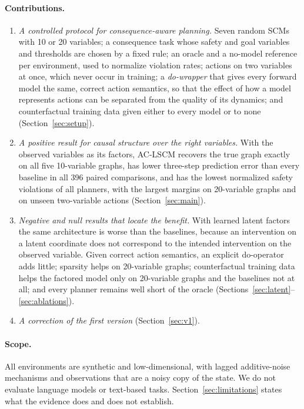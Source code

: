 \documentclass[11pt]{article}
\begin{document}
\paragraph{Contributions.}
\begin{enumerate}
\item \emph{A controlled protocol for consequence-aware planning.} Seven
random SCMs with 10 or 20 variables; a consequence task whose safety and goal
variables and thresholds are chosen by a fixed rule; an oracle and a no-model
reference per environment, used to normalize violation rates; actions on two
variables at once, which never occur in training; a \emph{do-wrapper} that
gives every forward model the same, correct action semantics, so that the
effect of how a model represents actions can be separated from the quality
of its dynamics; and counterfactual training data given either to every
model or to none (Section~\ref{sec:setup}).
\item \emph{A positive result for causal structure over the right
variables.} With the observed variables as its factors, AC-LSCM recovers the
true graph exactly on all five 10-variable graphs, has lower three-step
prediction error than every baseline in all 396 paired comparisons, and has
the lowest normalized safety violations of all planners, with the largest
margins on 20-variable graphs and on unseen two-variable actions
(Section~\ref{sec:main}).
\item \emph{Negative and null results that locate the benefit.} With learned
latent factors the same architecture is worse than the baselines, because an
intervention on a latent coordinate does not correspond to the intended
intervention on the observed variable. Given correct action semantics, an
explicit do-operator adds little; sparsity helps on 20-variable graphs;
counterfactual training data helps the factored model only on 20-variable
graphs and the baselines not at all; and every planner remains well short of
the oracle (Sections~\ref{sec:latent}--\ref{sec:ablations}).
\item \emph{A correction of the first version} (Section~\ref{sec:v1}).
\end{enumerate}

\paragraph{Scope.}
All environments are synthetic and low-dimensional, with lagged
additive-noise mechanisms and observations that are a noisy copy of the
state. We do not evaluate language models or text-based tasks.
Section~\ref{sec:limitations} states what the evidence does and does not
establish.
\end{document}
